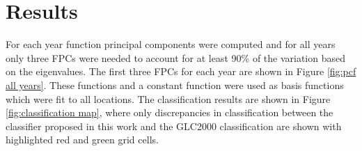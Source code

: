%
%



\section{Results} 
For each year function principal components were computed and for all years only three FPCs were needed to account for at least 90\% of the variation based on the eigenvalues. The first three FPCs for each year are shown in Figure \ref{fig:pcf all years}. These functions and a constant function were used as basis functions which were fit to all locations. The classification results are shown in Figure \ref{fig:classification map}, where only discrepancies in classification between the classifier proposed in this work and the GLC2000 classification are shown with highlighted red and green grid cells. 

